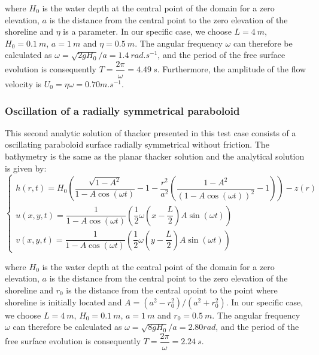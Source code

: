 where $H_0$ is the water depth at the central point of the domain for a zero elevation, $a$ is the distance from the central
point to the zero elevation of the shoreline and $\eta$ is a parameter.
In our specific case, we choose $L=4~m$, $H_0=0.1~m$, $a=1~m$ and $\eta=0.5~m$.
The angular frequency $\omega$ can therefore be calculated as $\omega = \sqrt{2gH_0}/a = 1.4~rad.s^{-1}$,
and the period of the free surface evolution is consequently $T= \dfrac{2 \pi}{\omega} = 4.49~s$.
Furthermore, the amplitude of the flow velocity is $U_0 = \eta \omega = 0.70 m.s^{-1}$.  \\

\subsubsection{Oscillation of a radially symmetrical paraboloid}

This second analytic solution of thacker presented in this test case consists of a oscillating paraboloid surface radially symmetrical
without friction. The bathymetry is the same as the planar thacker solution and
the analytical solution is given by:
\begin{equation}
  \left\{
    \begin{array}{ll}
      h(r,t) = H_0 \left( \dfrac{\sqrt{1- A^2}}{1-A\cos(\omega t)} - 1 - \dfrac{r^2}{a^2}\left(\dfrac{1-A^2}{(1-A\cos(\omega t))^2} -1 \right)\right) - z(r)\\
      u(x,y,t) = \dfrac{1}{1-A\cos(\omega t)} \left( \dfrac{1}{2} \omega \left( x - \dfrac{L}{2} \right) A \sin(\omega t )\right) \\
      v(x,y,t) = \dfrac{1}{1-A\cos(\omega t)} \left( \dfrac{1}{2} \omega \left( y - \dfrac{L}{2} \right) A \sin(\omega t )\right) 
    \end{array}
    \right.
    \label{eq:thacker2:analytical}
\end{equation}

where $H_0$ is the water depth at the central point of the domain for a zero
elevation, $a$ is the distance from the central point to the zero elevation of
the shoreline and $r_0$ is the distance from the central opoint to the point where shoreline is initially located and $A=(a^2-r_0^2)/(a^2+r_0^2)$.
In our specific case, we choose $L=4~m$, $H_0=0.1~m$, $a=1~m$ and $r_0=0.5~m$.
The angular frequency $\omega$ can therefore be calculated as $\omega = \sqrt{8gH_0}/a = 2.80rad$,
and the period of the free surface evolution is consequently $T= \dfrac{2 \pi}{\omega} = 2.24~s$.

